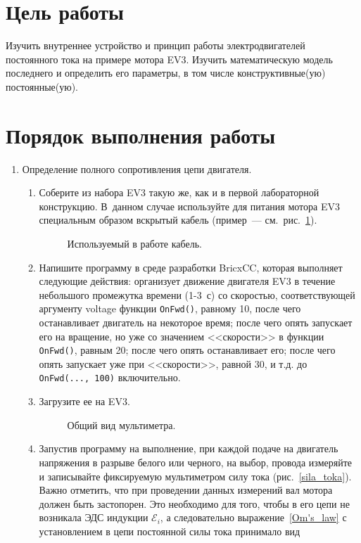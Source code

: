 \documentclass[12pt, a4paper, openany]{extarticle}
\begin{document}
\newpage
\section{Цель работы}
\hspace*{\parindent}Изучить внутреннее устройство и принцип работы электродвигателей постоянного тока на примере мотора EV3.
Изучить математическую модель последнего и определить его параметры, в том числе конструктивные(ую) постоянные(ую).
\section{Порядок выполнения работы}
\begin{enumerate}			
\item Определение полного сопротивления цепи двигателя.
\begin{enumerate}
\item Соберите из набора EV3 такую же, как и в первой лабораторной конструкцию. В~данном случае используйте для питания мотора EV3 специальным образом вскрытый кабель (пример~--- см.~рис.~\ref{wibe}).
\begin{figure}[h]
	\caption{Используемый в работе кабель.}
	\label{wibe}
\end{figure}
\item \label{prog}Напишите программу в среде разработки BricxCC, которая выполняет следующие действия: организует движение двигателя EV3 в течение небольшого промежутка времени (1-3~с) со скоростью, соответствующей аргументу voltage функции \verb|OnFwd()|, равному 10, после чего останавливает двигатель на некоторое время; после чего опять запускает его на вращение, но уже со значением <<скорости>> в функции \verb|OnFwd()|, равным 20; после чего опять останавливает его; после чего опять запускает уже при <<скорости>>, равной 30, и т.д. до  \verb|OnFwd(..., 100)| включительно.
\item Загрузите ее на EV3.
\begin{figure}[h]
	\caption{Общий вид мультиметра.}
	\label{multimetr}
\end{figure} 
\item Запустив программу на выполнение, при каждой подаче на двигатель напряжения в разрыве белого или черного, на выбор, провода измеряйте и записывайте фиксируемую мультиметром силу тока (рис.~\ref{sila_toka}). Важно отметить, что при проведении данных измерений вал мотора должен быть застопорен. Это необходимо для того, чтобы в его цепи не возникала ЭДС индукции $\mathcal E_i$, а следовательно выражение~\eqref{Om's_law} с установлением в цепи постоянной силы тока принимало вид

\end{enumerate}
\end{enumerate}
\end{document}
